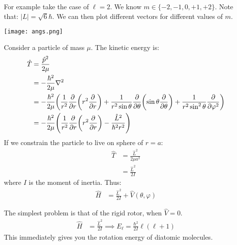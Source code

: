 For example take the case of $\ell = 2$. We know $m \in \{-2, -1, 0, +1, +2\}$. Note that: $|L| = \sqrt{6} \hbar$.
We can then plot different vectors for different values of $m$.

\texttt{[image: angs.png]}

Consider a particle of mass $\mu$. The kinetic energy is:
\begin{align*}
    \hat{T} &= \frac{\hat{p}^2}{2 \mu} \\
    &= -\frac{\hbar^2}{2\mu} \nabla^2 \\
    &= -\frac{\hbar^2}{2\mu} \qty(\frac{1}{r^2} \pdv{}{r} \qty(r^2 \pdv{}{r}) + \frac{1}{r^2 \sin \theta} \pdv{}{\theta} \qty(\sin \theta \pdv{}{\theta}) + \frac{1}{r^2 \sin^2 \theta} \pdv{}{\varphi^2}) \\
    &= -\frac{\hbar^2}{2\mu} \qty(\frac{1}{r^2} \pdv{}{r} \qty(r^2 \pdv{}{r}) - \frac{\hat{L}^2}{\hbar^2 r^2})
\end{align*}
If we constrain the particle to live on sphere of $r = a$:
\begin{align*}
    \hat{T} &=\frac{\hat{L}^2}{2 \mu a^2} \\
    &= \frac{\hat{L}^2}{2I}
\end{align*}
where $I$ is the moment of inertia. Thus:
\begin{align*}
    \hat{H} &= \frac{\hat{L}^2}{2I} + \hat{V}(\theta, \varphi)
\end{align*}

The simplest problem is that of the rigid rotor, when $\hat{V} = 0$.
\begin{align*}
    \hat{H} &= \frac{\hat{L}^2}{2I} \implies E_{\ell} = \frac{\hbar^2}{2I} \ell (\ell + 1)
\end{align*}
This immediately gives you the rotation energy of diatomic molecules.
